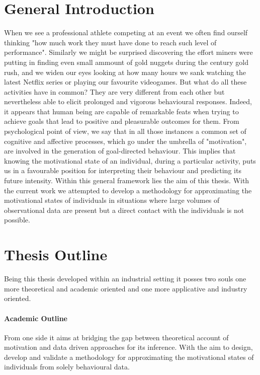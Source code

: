 \section*{General Introduction}
When we see a professional athlete competing at an event we often find ourself thinking "how much work they must have done to reach such level of performance". Similarly we might be surprised discovering the effort miners were putting in finding even small ammount of gold nuggets during the  century gold rush, and we widen our eyes looking at how many hours we sank watching the latest Netflix series or playing our favourite videogames. But what do all these activities have in common? They are very different from each other but nevertheless able to elicit prolonged and vigorous behavioural responses. Indeed, it appears that human being are capable of remarkable feats when trying to achieve goals that lead to positive and pleasurable outcomes for them. From psychological point of view, we say that in all those instances a common set of cognitive and affective processes, which go under the umbrella of "motivation", are involved in the generation of goal-directed behaviour. This implies that knowing the motivational state of an individual, during a particular activity, puts us in a favourable position for interpreting their behaviour and predicting its future intensity. Within this general framework lies the aim of this thesis. With the current work we attempted to develop a methodology for approximating the motivational states of individuals in situations where large volumes of observational data are present but a direct contact with the individuals is not possible.


\section*{Thesis Outline}
Being this thesis developed within an industrial setting it posses two souls one more theoretical and academic oriented and one more applicative and industry oriented.
\paragraph*{Academic Outline}
From one side it aims at bridging the gap between theoretical account of motivation and data driven approaches for its inference. With the aim to design, develop and validate a methodology for approximating the motivational states of individuals from solely behavioural data. 

